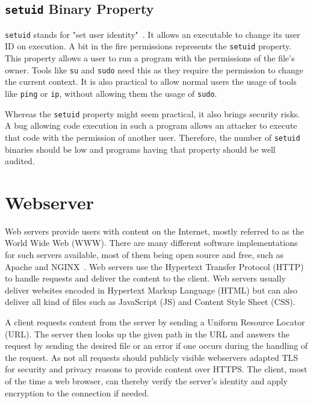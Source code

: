 \subsection{\texttt{setuid} Binary Property}

\texttt{setuid} stands for "set user identity"~.
It allows an executable to change its user ID on execution. A bit in the fire
permissions represents the \texttt{setuid} property. This property allows a user
to run a program with the permissions of the file's owner. Tools like
\texttt{su} and \texttt{sudo} need this as they require the permission to change
the current context. It is also practical to allow normal users the usage of
tools like \texttt{ping} or \texttt{ip}, without allowing them the usage of
\texttt{sudo}.

Whereas the \texttt{setuid} property might seem practical, it also brings
security risks. A bug allowing code execution in such a program allows an
attacker to execute that code with the permission of another user. Therefore,
the number of \texttt{setuid} binaries should be low and programs having that
property should be well audited.

\section{Webserver}

Web servers provide users with content on the Internet, mostly referred to as
the World Wide Web (WWW). There are many different software implementations for
such servers available, most of them being open source and free, such as Apache
and NGINX~. Web servers use the Hypertext
Transfer Protocol (HTTP) to handle requests and deliver the content to the
client. Web servers usually deliver websites encoded in Hypertext Markup
Language (HTML) but can also deliver all kind of files such as JavaScript (JS)
and Content Style Sheet (CSS).

A client requests content from the server by sending a Uniform Resource Locator
(URL). The server then looks up the given path in the URL and answers the
request by sending the desired file or an error if one occurs during the
handling of the request. As not all requests should publicly visible webservers
adapted TLS for security and privacy reasons to provide content over HTTPS. The
client, most of the time a web browser, can thereby verify the server's identity
and apply encryption to the connection if needed.

